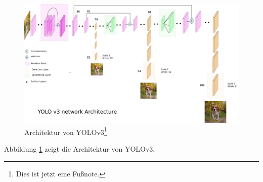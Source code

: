 \begin{figure}[h]
	
	\begin{center}
		
		\includegraphics[width=16cm]{images/Yolov3 archtecture.png}
		
		\caption{Architektur von YOLOv3\footnote{\label{foot:1}Dies ist jetzt eine Fußnote.}}
		
		\label{yolo_arch}
		
	\end{center}
	
	
\end{figure}

Abbildung \ref{yolo_arch} zeigt die Architektur von YOLOv3.








